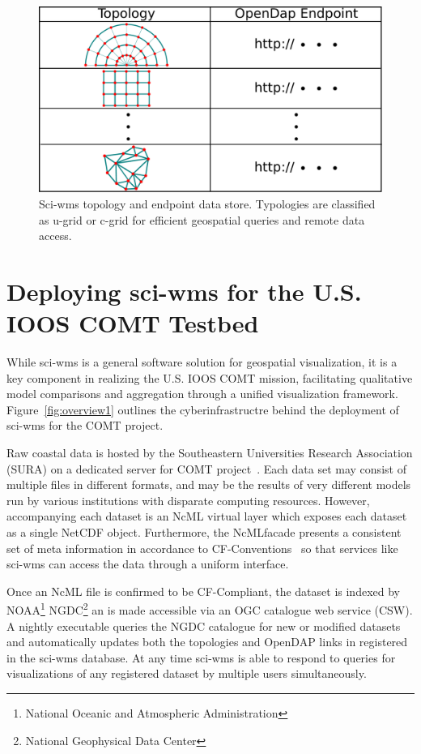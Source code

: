 \documentclass[11pt,twocolumn,twoside]{IEEEtran}
\newcommand{\comt}{COMT}
\newcommand{\ioos}{IOOS}
\newcommand{\sura}{SURA}
\newcommand{\ogc}{OGC}
\newcommand{\csw}{CSW}
\newcommand{\ugrid}{u-grid}
\newcommand{\cgrid}{c-grid}
\newcommand{\ncml}{NcML}
\newcommand{\noaa}{NOAA}
\newcommand{\ngdc}{NGDC}
\newcommand{\opendap}{OpenDAP}
\newcommand{\netcdf}{NetCDF}
\newcommand{\sciwms}{sci-wms}
\newcommand{\Sciwms}{Sci-wms}
\begin{document}
\begin{figure}
  \centering
  \includegraphics[width=\columnwidth]{./figs/sciwms_db_topology_endpoints.pdf}
  \caption{\Sciwms{} topology and endpoint data store. Typologies are
    classified as \ugrid{} or \cgrid{} for efficient geospatial
    queries and remote data access.}
  \label{fig:sciwms_topology_endpoints}
\end{figure}

\section{Deploying \sciwms{} for the U.S. \ioos{} \comt{} Testbed}
While \sciwms{} is a general software solution for geospatial
visualization, it is a key component in realizing the U.S. \ioos{}
\comt{} mission, facilitating qualitative model comparisons and
aggregation through a unified visualization
framework. Figure~\ref{fig:overview1} outlines the cyberinfrastructre
behind the deployment of \sciwms{} for the \comt{} project.

Raw coastal data is hosted by the Southeastern Universities Research
Association (\sura{}) on a dedicated server for \comt{}
project~\cite{luettich12}. Each data set may consist of multiple files
in different formats, and may be the results of very different models
run by various institutions with disparate computing
resources. However, accompanying each dataset is an \ncml{} virtual
layer which exposes each dataset as a single \netcdf{}
object. Furthermore, the \ncml facade presents a consistent set of meta
information in accordance to CF-Conventions~\cite{cf} so
that services like \sciwms{} can access the data through a uniform
interface.

Once an \ncml{} file is confirmed to be CF-Compliant, the dataset is
indexed by \noaa{}\footnote{National Oceanic and Atmospheric
  Administration} \ngdc{}\footnote{National Geophysical Data Center}
an is made accessible via an \ogc{} catalogue web service (\csw{}). A
nightly executable queries the \ngdc{} catalogue for new or modified
datasets and automatically updates both the topologies and \opendap{}
links in registered in the \sciwms{} database. At any time \sciwms{} is able to
respond to queries for visualizations of any registered dataset by
multiple users simultaneously.




\end{document}
